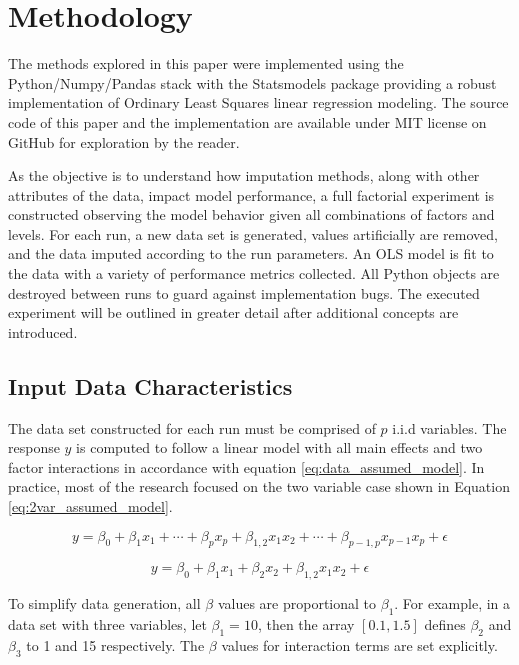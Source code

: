 \documentclass[../../paper.tex]{subfiles}
\begin{document}
\section{Methodology}
The methods explored in this paper were implemented using
the Python/Numpy/Pandas stack with the Statsmodels package providing a robust
implementation of Ordinary Least Squares linear regression modeling.
The source code of this paper and the implementation are available under MIT license on GitHub for exploration by the reader.

As the objective is to understand how imputation methods, along with other attributes of the data, impact model performance, a full factorial experiment is constructed observing the model behavior given all combinations of factors and levels.
For each run, a new data set is generated, values artificially are removed, and the data imputed according to the run parameters.
An OLS model is fit to the data with a variety of performance metrics collected.
All Python objects are destroyed between runs to guard against implementation bugs.
The executed experiment will be outlined in greater detail after additional concepts are introduced.


\subsection{Input Data Characteristics}
The data set constructed for each run must be comprised of $p$ i.i.d variables.
The response $y$ is computed to follow a linear model with all main effects and two factor interactions in accordance with equation \ref{eq:data_assumed_model}.
In practice, most of the research focused on the two variable case shown in Equation \ref{eq:2var_assumed_model}.

\begin{equation}\label{eq:data_assumed_model}
  y = \beta_{0} + \beta_{ 1 } x_{1}  + \cdots + \beta_{p}x_{p} +
  \beta_{1,2}x_{1}x_{2} + \cdots +\beta_{p-1,p}x_{p-1}x_{p} + \epsilon
\end{equation}


\begin{equation}\label{eq:2var_assumed_model}
  y = \beta_{0} + \beta_{1} x_{1} + \beta_{2}x_{2} +
  \beta_{1,2} x_{1}x_{2} + \epsilon
\end{equation}

To simplify data generation, all $\beta$ values are proportional to $\beta_{1}$.
For example, in a data set with three variables, let $\beta_{1} = 10$, then
the array $[0.1, 1.5]$ defines $\beta_{2}$ and $\beta_{3}$ to 1 and 15 respectively.
The $\beta$ values for interaction terms are set explicitly.
\end{document}
